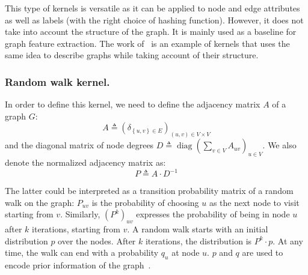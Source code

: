             This type of kernels is versatile as it can be applied to node and edge attributes as well as labels (with the right choice of hashing function).
            However, it does not take into account the structure of the graph.
            It is mainly used as a baseline for graph feature extraction.
            The work of~\textcite{shervashidze2011weisfeiler} is an example of kernels that uses the same idea to describe graphs while taking account of their structure.

        \subsubsection{Random walk kernel.}
            In order to define this kernel, we need to define the adjacency matrix $A$ of a graph $G$:
            \begin{equation}
                \label{eq::adjacency_matrix}
                A \triangleq \left(\delta_{\left\{u,v\right\}\in E}\right)_{(u, v) \in V\times V}
            \end{equation}
            and the diagonal matrix of node degrees $D\triangleq \operatorname{diag}\left(\sum_{v \in V}A_{uv}\right)_{u \in V}$.
            We also denote the normalized adjacency matrix as:
            \begin{equation}
                \label{eq::normalized_adjacency_matrix}
                P \triangleq A\cdot D^{-1}
            \end{equation}

            The latter could be interpreted as a transition probability matrix of a random walk on the graph:
            $P_{uv}$ is the probability of choosing $u$ as the next node to visit starting from $v$.
            Similarly, $\left(P^k\right)_{uv}$ expresses the probability of being in node $u$ after $k$ iterations, starting from $v$.
            A random walk starts with an initial distribution $p$ over the nodes.
            After $k$ iterations, the distribution is $P^k\cdot p$.
            At any time, the walk can end with a probability $q_u$ at node $u$.
            $p$ and $q$ are used to encode prior information of the graph~\parencite{vishwanathan2010graph}.\\
            
